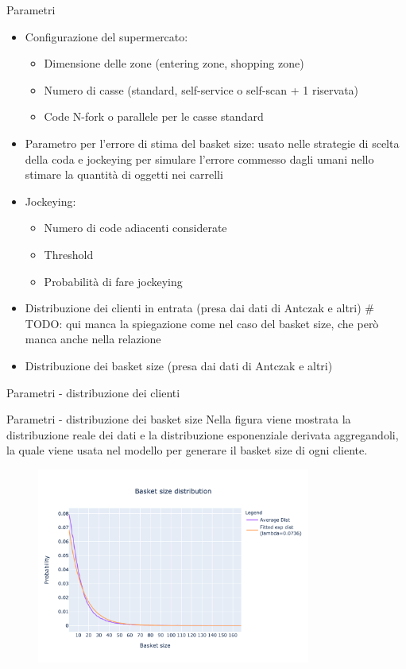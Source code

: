 \begin{frame}{Parametri}
	\begin{itemize}
		\item Configurazione del supermercato:
		\begin{itemize}
			\item Dimensione delle zone (entering zone, shopping zone)
			\item Numero di casse (standard, self-service o self-scan + 1 riservata)
			\item Code N-fork o parallele per le casse standard
		\end{itemize}
		\item Parametro per l'errore di stima del basket size: usato nelle strategie di scelta della coda e jockeying per simulare l'errore commesso dagli umani nello stimare la quantità di oggetti nei carrelli
		\item Jockeying:
		\begin{itemize}
			\item Numero di code adiacenti considerate
			\item Threshold
			\item Probabilità di fare jockeying
		\end{itemize}
		\item Distribuzione dei clienti in entrata (presa dai dati di Antczak e altri\footnotemark) \# TODO: qui manca la spiegazione come nel caso del basket size, che però manca anche nella relazione
		\item Distribuzione dei basket size (presa dai dati di Antczak e altri\footnotemark[\value{footnote}])
	\end{itemize}
\end{frame}

\begin{frame}{Parametri - distribuzione dei clienti}
\end{frame}

\begin{frame}{Parametri - distribuzione dei basket size}
	Nella figura viene mostrata la distribuzione reale dei dati e la distribuzione esponenziale derivata aggregandoli, la quale viene usata nel modello per generare il basket size di ogni cliente.
	\begin{figure}[H]
		\centering
		\includegraphics[width=9cm]{"../report/images/basket_size_fitted.png"}
		\label{fig:dist_basket_size}
	\end{figure}
\end{frame}


